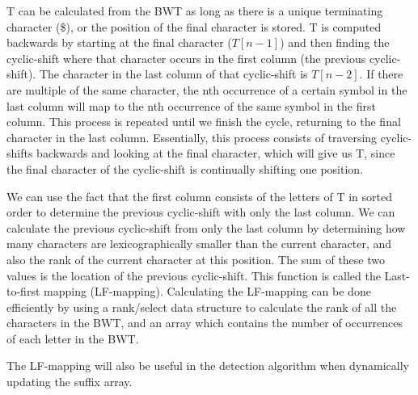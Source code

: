 T can be calculated from the BWT as long as there is a unique terminating character (\$),
or the position of the final character is stored. T is computed backwards by starting at
the final character ($T[n - 1]$) and then finding the cyclic-shift where that character
occurs in the first column (the previous cyclic-shift). The character in the last column
of that cyclic-shift is $T[n - 2]$. If there are multiple of the same character, the nth
occurrence of a certain symbol in the last column will map to the nth occurrence of the
same symbol in the first column. This process is repeated until we finish the cycle,
returning to the final character in the last column. Essentially, this process consists of
traversing cyclic-shifts backwards and looking at the final character, which will give us
T, since the final character of the cyclic-shift is continually shifting one position.

We can use the fact that the first column consists of the letters of T in sorted order to
determine the previous cyclic-shift with only the last column. We can calculate the
previous cyclic-shift from only the last column by determining how many characters are
lexicographically smaller than the current character, and also the rank of the current
character at this position. The sum of these two values is the location of the previous
cyclic-shift. This function is called the Last-to-first mapping (LF-mapping). Calculating
the LF-mapping can be done efficiently by using a rank/select data structure to calculate
the rank of all the characters in the BWT, and an array which contains the number of
occurrences of each letter in the BWT.

The LF-mapping will also be useful in the detection algorithm when dynamically updating
the suffix array.

